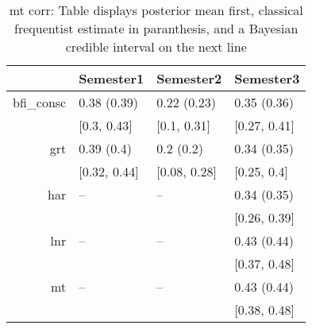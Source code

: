 \begin{table}[ht]
\centering
\begin{tabular}{rlll}
  \hline
 & Semester1 & Semester2 & Semester3 \\ 
  \hline
bfi\_consc & 0.38 (0.39) & 0.22 (0.23) & 0.35 (0.36) \\ 
   & [0.3, 0.43] & [0.1, 0.31] & [0.27, 0.41] \\ 
  grt & 0.39 (0.4) & 0.2 (0.2) & 0.34 (0.35) \\ 
     & [0.32, 0.44] & [0.08, 0.28] & [0.25, 0.4] \\ 
  har & -- & -- & 0.34 (0.35) \\ 
       &  &  & [0.26, 0.39] \\ 
  lnr & -- & -- & 0.43 (0.44) \\ 
         &  &  & [0.37, 0.48] \\ 
  mt & -- & -- & 0.43 (0.44) \\ 
           &  &  & [0.38, 0.48] \\ 
   \hline
\end{tabular}
\caption{mt corr: Table displays posterior mean first, classical frequentist estimate in paranthesis, and a Bayesian credible interval on the next line} 
\label{mt_corr}
\end{table}
